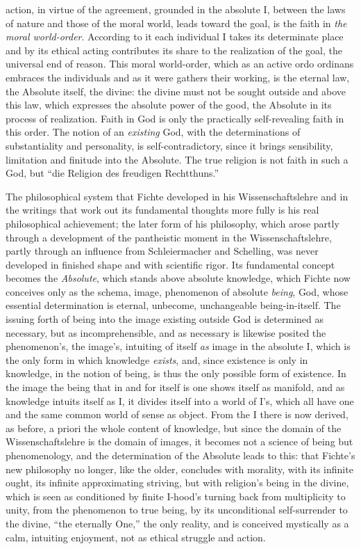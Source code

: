 action, in virtue of the agreement, grounded in the absolute I, between
the laws of nature and those of the moral world, leads toward the goal,
is the faith in \emph{the moral world-order}. According to it each
individual I takes its determinate place and by its ethical acting
contributes its share to the realization of the goal, the universal end
of reason. This moral world-order, which as an active ordo ordinans
embraces the individuals and as it were gathers their working, is the
eternal law, the Absolute itself, the divine: the divine must not be
sought outside and above this law, which expresses the absolute power
of the good, the Absolute in its process of realization. Faith in God
is only the practically self-revealing faith in this order. The notion
of an \emph{existing} God, with the determinations of substantiality
and personality, is self-contradictory, since it brings sensibility,
limitation and finitude into the Absolute. The true religion is not
faith in such a God, but ``die Religion des freudigen Rechtthuns.''

\divrule

The philosophical system that Fichte developed in his
Wissenschaftslehre and in the writings that work out its fundamental
thoughts more fully is his real philosophical achievement; the later
form of his philosophy, which arose partly through a development of the
pantheistic moment in the Wissenschaftslehre, partly through an
influence from Schleiermacher and Schelling, was never developed in
finished shape and with scientific rigor. Its fundamental concept
becomes the \emph{Absolute}, which stands above absolute knowledge,
which Fichte now conceives only as the schema, image, phenomenon of
absolute \emph{being}, God, whose essential determination is eternal,
unbecome, unchangeable being-in-itself. The issuing forth of being into
the image existing outside God is determined as necessary, but as
incomprehensible, and as necessary is likewise posited the phenomenon's,
the image's, intuiting of itself \emph{as} image in the absolute I,
which is the only form in which knowledge \emph{exists}, and, since
existence is only in knowledge, in the notion of being, is thus the
only possible form of existence. In the image the being that in and for
itself is one shows itself as manifold, and as knowledge intuits itself
as I, it divides itself into a world of I's, which all have one and the
same common world of sense as object. From the I there is now derived,
as before, a priori the whole content of knowledge, but since the
domain of the Wissenschaftslehre is the domain of images, it becomes
not a science of being but phenomenology, and the determination of the
Absolute leads to this: that Fichte's new philosophy no longer, like
the older, concludes with morality, with its infinite ought, its
infinite approximating striving, but with religion's being in the
divine, which is seen as conditioned by finite I-hood's turning back
from multiplicity to unity, from the phenomenon to true being, by its
unconditional self-surrender to the divine, ``the eternally One,'' the
only reality, and is conceived mystically as a calm, intuiting
enjoyment, not as ethical struggle and action.

